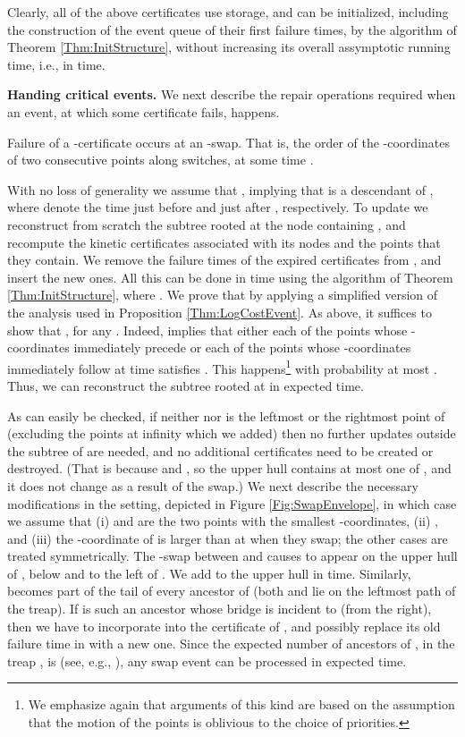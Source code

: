 \documentclass[11pt]{article}
\begin{document}
Clearly, all of the above certificates use  storage,
and can be initialized, including the construction of the event queue  of their first failure times, by the algorithm of Theorem
\ref{Thm:InitStructure}, without increasing its overall assymptotic
running time, i.e., in  time.

\medskip
\noindent
{\bf Handing critical events.} 
We next describe the repair operations 
required when an event, at which some certificate fails, happens. 

\smallskip
{} Failure of a -certificate occurs at an -swap.
That is,
the order of the -coordinates of two consecutive points along  switches, at some time .

With no loss of generality we assume that ,
implying that  is a descendant of , where  denote the time just before and just after , respectively.  To update
  we reconstruct  from scratch the subtree rooted at the node  
containing , and recompute the kinetic
 certificates associated with its nodes and the points that they
contain. We remove the failure times
 of the expired certificates from , and insert the new ones.  All
 this can be done in  time using the algorithm of
 Theorem \ref{Thm:InitStructure}, where . We prove that  by applying a
 simplified version of the analysis used in Proposition
 \ref{Thm:LogCostEvent}. As above, it suffices to show that
 , for any .  Indeed,  implies
 that either each of the  points 
whose -coordinates immediately precede  or each of the
 points 
whose -coordinates immediately follow  at time 
satisfies  . 
This happens\footnote{\small We emphasize again that arguments of this kind are based on the assumption that the motion of the points is oblivious to the choice of priorities.} with probability at most
 . Thus, we can reconstruct the subtree rooted at  in  expected time.

 As can easily be checked, if neither  nor  is
the leftmost or the rightmost point of  (excluding the points
at infinity which we added)
 then no further updates outside the
 subtree of  are needed, and no additional certificates need to be
 created or destroyed. (That is because  and , so the upper hull  contains at most one of , and it does not change as a result of the swap.)
 We next describe the necessary modifications in the setting, depicted in Figure \ref{Fig:SwapEnvelope}, in which case we
 assume that (i)  and  are the two points with the smallest
 -coordinates, (ii) , and (iii)
the -coordinate of
  is larger than at 
when they swap; the other cases are treated
 symmetrically.  The -swap between  and  causes  to appear
 on the upper hull of , below and to the left of .
We add  to the upper hull in  
 time. Similarly,  becomes part of the tail  of every
 ancestor  of  (both  and  lie on the leftmost path of the treap). If  is such an ancestor whose bridge is incident to  (from the right), then we have to incorporate  into the certificate of
 , and possibly replace its old failure time in
  with a new one. Since the expected number of ancestors  of
 , in the treap , is  (see, e.g., \cite{SA96}), any swap event can
 be processed in  expected time.
\end{document}
